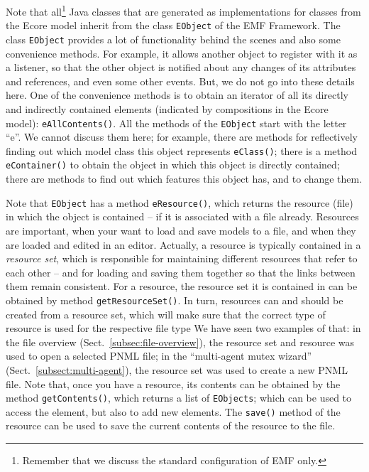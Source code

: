 Note that all\footnote
  {Remember that we discuss the standard configuration of EMF only.}
Java classes that are generated as implementations for classes from the Ecore
model inherit from the class {\tt EObject}%
of the EMF Framework. The class {\tt EObject} provides a lot of functionality
behind the scenes and also some convenience methods. For example, it allows another object
to register with it as a listener, so that the other object is notified
about any changes of its attributes and references, and even some other events.
But, we do not go into these details here. One of the convenience methods
is to obtain an iterator of all its directly and indirectly contained
elements (indicated by compositions in the Ecore model): {\tt eAllContents()}.%
All the methods of the {\tt EObject} start with the letter ``e''. We
cannot discuss them here; for example, there are methods for reflectively
finding out which model class this object represents {\tt eClass()};%
there is a method {\tt eContainer()}%
to obtain the object in which this object is directly contained; there are
methods to find out which features this object has, and to change them.

Note that {\tt EObject} has a method {\tt eResource()},%
which returns the resource (file)%
in which the object is contained -- if it is associated with
a file already. Resources are important, when your want to load and save
models to a file, and when they are loaded and edited in an editor. Actually,
a resource is typically contained in a \emph{resource set},%
which is responsible for maintaining different resources that refer to each
other -- and for loading and saving them together so that the links between them
remain consistent. For a resource, the resource set it is contained in can be
obtained by method {\tt getResourceSet()}.%
In turn, resources can and should be created from a resource set, which will
make sure that the correct type of resource is used for the respective file type We
have seen two examples of that: in the file overview (Sect.~\ref{subsec:file-overview}),
the resource set and resource was used to open a selected PNML file; in the
``multi-agent mutex wizard'' (Sect.~\ref{subsect:multi-agent}), the resource set was used
to create a new PNML file. Note that, once you have a resource, its contents
can be obtained by the method {\tt getContents()},%
which returns a list of {\tt EObjects}; which can be used to access the element,
but also to add new elements. The {\tt save()}%
method of the resource can be used to save the current contents of the resource
to the file.


